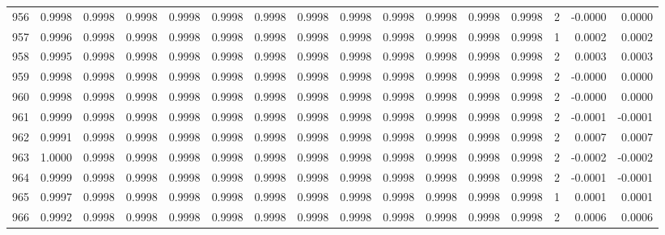 \begin{tabular}{lrrrrrrrrrrrrrrr}
956 &      0.9998 &  0.9998 &  0.9998 &  0.9998 &  0.9998 &  0.9998 &  0.9998 &  0.9998 &  0.9998 &  0.9998 &   0.9998 &     0.9998 &      2 &                   -0.0000 &                     0.0000 \\
957 &      0.9996 &  0.9998 &  0.9998 &  0.9998 &  0.9998 &  0.9998 &  0.9998 &  0.9998 &  0.9998 &  0.9998 &   0.9998 &     0.9998 &      1 &                    0.0002 &                     0.0002 \\
958 &      0.9995 &  0.9998 &  0.9998 &  0.9998 &  0.9998 &  0.9998 &  0.9998 &  0.9998 &  0.9998 &  0.9998 &   0.9998 &     0.9998 &      2 &                    0.0003 &                     0.0003 \\
959 &      0.9998 &  0.9998 &  0.9998 &  0.9998 &  0.9998 &  0.9998 &  0.9998 &  0.9998 &  0.9998 &  0.9998 &   0.9998 &     0.9998 &      2 &                   -0.0000 &                     0.0000 \\
960 &      0.9998 &  0.9998 &  0.9998 &  0.9998 &  0.9998 &  0.9998 &  0.9998 &  0.9998 &  0.9998 &  0.9998 &   0.9998 &     0.9998 &      2 &                   -0.0000 &                     0.0000 \\
961 &      0.9999 &  0.9998 &  0.9998 &  0.9998 &  0.9998 &  0.9998 &  0.9998 &  0.9998 &  0.9998 &  0.9998 &   0.9998 &     0.9998 &      2 &                   -0.0001 &                    -0.0001 \\
962 &      0.9991 &  0.9998 &  0.9998 &  0.9998 &  0.9998 &  0.9998 &  0.9998 &  0.9998 &  0.9998 &  0.9998 &   0.9998 &     0.9998 &      2 &                    0.0007 &                     0.0007 \\
963 &      1.0000 &  0.9998 &  0.9998 &  0.9998 &  0.9998 &  0.9998 &  0.9998 &  0.9998 &  0.9998 &  0.9998 &   0.9998 &     0.9998 &      2 &                   -0.0002 &                    -0.0002 \\
964 &      0.9999 &  0.9998 &  0.9998 &  0.9998 &  0.9998 &  0.9998 &  0.9998 &  0.9998 &  0.9998 &  0.9998 &   0.9998 &     0.9998 &      2 &                   -0.0001 &                    -0.0001 \\
965 &      0.9997 &  0.9998 &  0.9998 &  0.9998 &  0.9998 &  0.9998 &  0.9998 &  0.9998 &  0.9998 &  0.9998 &   0.9998 &     0.9998 &      1 &                    0.0001 &                     0.0001 \\
966 &      0.9992 &  0.9998 &  0.9998 &  0.9998 &  0.9998 &  0.9998 &  0.9998 &  0.9998 &  0.9998 &  0.9998 &   0.9998 &     0.9998 &      2 &                    0.0006 &                     0.0006 \\

\end{tabular}
